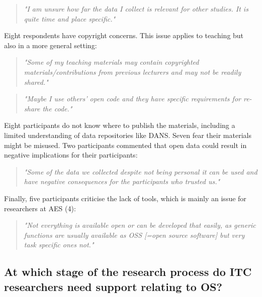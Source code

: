 \documentclass[gc, manuscript]{copernicus}
\begin{document}
\begin{quote}
\textit{"I am unsure how far the data I collect is relevant for other studies. It is quite time and place specific."}
\end{quote}

Eight respondents have copyright concerns. This issue applies to
teaching but also in a more general setting:

\begin{quote}
\textit{"Some of my teaching materials may contain copyrighted materials/contributions from previous lecturers and may not be readily shared."}
\end{quote}

\begin{quote}
\textit{"Maybe I use others' open code and they have specific requirements for re-share the code."}
\end{quote}

Eight participants do not know where to publish the materials, including
a limited understanding of data repositories like DANS. Seven fear their
materials might be misused. Two participants commented that open data
could result in negative implications for their participants:

\begin{quote}
\textit{"Some of the data we collected despite not being personal it can be used and have negative consequences for the participants who trusted us."}
\end{quote}

Finally, five participants criticise the lack of tools, which is mainly
an issue for researchers at AES (4):

\begin{quote}
\textit{"Not everything is available open or can be developed that easily, as generic functions are usually available as OSS [=open source software] but very task specific ones not."}
\end{quote}

\subsection{At which stage of the research process do ITC researchers
need support relating to OS?}
\end{document}
